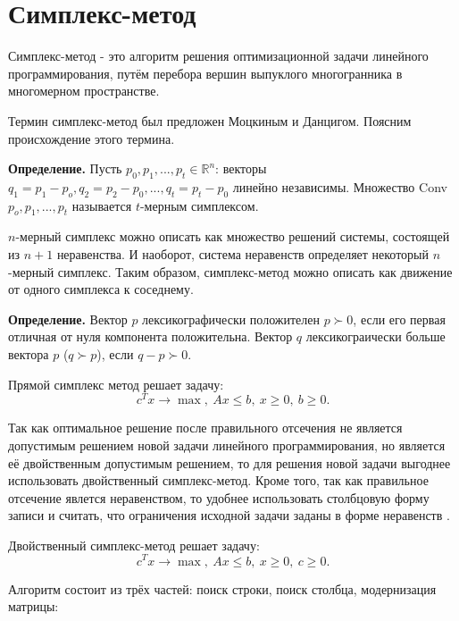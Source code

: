 \documentclass[a4paper,14pt,russian]{extreport}
\begin{document}
\section{Симплекс-метод}

Симплекс-метод - это алгоритм решения оптимизационной задачи линейного программирования, путём перебора вершин выпуклого многогранника в многомерном пространстве.
\par
Термин симплекс-метод был предложен Моцкиным и Данцигом\cite{dantzig}. Поясним происхождение этого термина. 
\par
{\bf Определение.} Пусть $p_0,p_1,...,p_t \in \mathbb{R}^n$: векторы $q_1=p_1-p_o,q_2=p_2-p_0,...,q_t=p_t-p_0$ линейно независимы. Множество Conv{$p_o,p_1,...,p_t$} называется $t$-мерным симплексом. 
\par 
$n$-мерный симплекс можно описать как множество решений системы, состоящей из $n+1$ неравенства. И наоборот, система неравенств определяет некоторый $n$-мерный симплекс. Таким образом, симплекс-метод можно описать как движение от одного симплекса к соседнему. 
\par
{\bf Определение.} Вектор $p$ лексикографически положителен $p \succ 0$, если его первая отличная от нуля компонента положительна. Вектор $q$ лексикограически больше вектора $p$ ($q \succ p$), если $q-p \succ 0$.
\par
Прямой симплекс метод решает задачу:
$$c^Tx \rightarrow \max,~ Ax \le b,~ x \ge 0,~ b \ge 0.$$
\par
Так как оптимальное решение после правильного отсечения не является допустимым решением новой задачи линейного программирования, но является её двойственным допустимым решением, то для решения новой задачи выгоднее использовать двойственный симплекс-метод. Кроме того, так как правильное отсечение явлется неравенством, то удобнее использовать столбцовую форму записи и считать, что ограничения исходной задачи заданы в форме неравенств \cite{shevchenko}.
\par
Двойственный симплекс-метод решает задачу:
$$c^Tx \rightarrow \max,~ Ax \le b,~ x \ge 0,~ c \ge 0.$$
\par
Алгоритм состоит из трёх частей: поиск строки, поиск столбца, модернизация матрицы:
\end{document}
